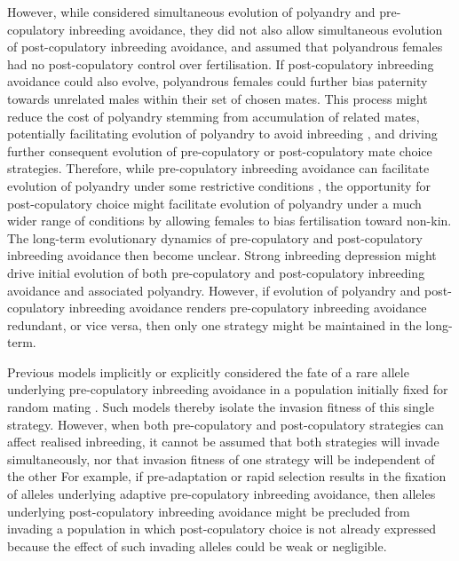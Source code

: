 \documentclass[10pt,letterpaper]{article}
\begin{document}
However, while \cite{Duthie} considered simultaneous evolution of polyandry and pre-copulatory inbreeding avoidance, they did not also allow simultaneous evolution of post-copulatory inbreeding avoidance, and assumed that polyandrous females had no post-copulatory control over fertilisation. If post-copulatory inbreeding avoidance could also evolve, polyandrous females could further bias paternity towards unrelated males within their set of chosen mates. This process might reduce the cost of polyandry stemming from accumulation of related mates, potentially facilitating evolution of polyandry to avoid inbreeding \cite[][]{Zeh1997}, and driving further consequent evolution of pre-copulatory or post-copulatory mate choice strategies. Therefore, while pre-copulatory inbreeding avoidance can facilitate evolution of polyandry under some restrictive conditions \cite[][]{Duthie}, the opportunity for post-copulatory choice might facilitate evolution of polyandry under a much wider range of conditions by allowing females to bias fertilisation toward non-kin. The long-term evolutionary dynamics of pre-copulatory and post-copulatory inbreeding avoidance then become unclear. Strong inbreeding depression might drive initial evolution of both pre-copulatory and post-copulatory inbreeding avoidance and associated polyandry. However, if evolution of polyandry and post-copulatory inbreeding avoidance renders pre-copulatory inbreeding avoidance redundant, or vice versa, then only one strategy might be maintained in the long-term.

Previous models implicitly or explicitly considered the fate of a rare allele underlying pre-copulatory inbreeding avoidance in a population initially fixed for random mating \cite[e.g.,][]{Parker1979, Parker2006, Duthie, Duthie2016a}. Such models thereby isolate the invasion fitness of this single strategy. However, when both pre-copulatory and post-copulatory strategies can affect realised inbreeding, it cannot be assumed that both strategies will invade simultaneously, nor that invasion fitness of one strategy will be independent of the other For example, if pre-adaptation or rapid selection results in the fixation of alleles underlying adaptive pre-copulatory inbreeding avoidance, then alleles underlying post-copulatory inbreeding avoidance might be precluded from invading a population in which post-copulatory choice is not already expressed because the effect of such invading alleles could be weak or negligible. 
\end{document}
